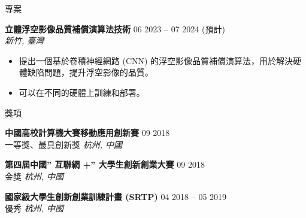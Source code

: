 \documentclass{resume}
\begin{document}
\begin{rSection}{專案}
    \item \textbf{立體浮空影像品質補償演算法技術} \hfill {06 2023 -- 07 2024 (預計)}\\
    \mbox{} \hfill \textit{新竹, 臺灣}
    \vspace{-0.5em}
    \begin{itemize}
        \item 提出一個基於卷積神經網路 (CNN) 的浮空影像品質補償演算法，用於解決硬體缺陷問題，提升浮空影像的品質。
        \item 可以在不同的硬體上訓練和部署。
    \end{itemize}
\end{rSection} 

\vspace{-1em}
\begin{rSection}{獎項}
\vspace{-1.25em}
    \item \textbf{中國高校計算機大賽移動應用創新賽} \hfill {09 2018}\\
    {一等獎、最具創新獎} \hfill \textit{杭州, 中國}

    \item \textbf{第四屆中國” 互聯網 +” 大學生創新創業大賽} \hfill {09 2018}\\
    {金獎} \hfill \textit{杭州, 中國}

    \item \textbf{國家級大學生創新創業訓練計畫 (SRTP)} \hfill {04 2018 -- 05 2019}\\
    {優秀} \hfill \textit{杭州, 中國}
\end{rSection} 


\end{document}
